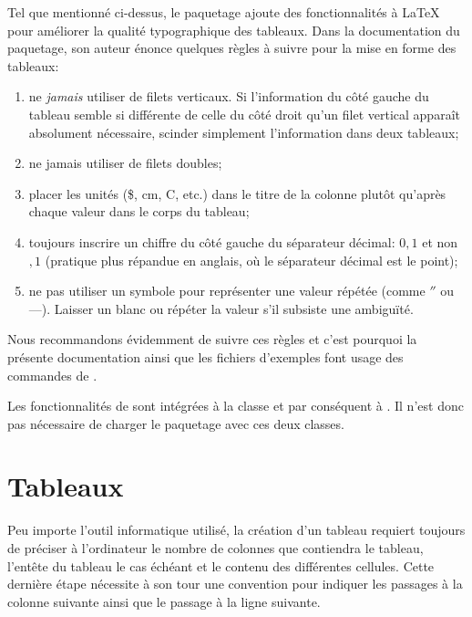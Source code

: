 Tel que mentionné ci-dessus, le paquetage  ajoute des
fonctionnalités à {\LaTeX} pour améliorer la qualité typographique des
tableaux. Dans la documentation du paquetage, son auteur énonce
quelques règles à suivre pour la mise en forme des tableaux:
\begin{enumerate}
\item ne \emph{jamais} utiliser de filets verticaux. Si l'information
  du côté gauche du tableau semble si différente de celle du côté
  droit qu'un filet vertical apparaît absolument nécessaire, scinder
  simplement l'information dans deux tableaux;
\item ne jamais utiliser de filets doubles;
\item placer les unités (\$, cm, {\textdegree}C, etc.) dans le titre
  de la colonne plutôt qu'après chaque valeur dans le corps du
  tableau;
\item toujours inscrire un chiffre du côté gauche du séparateur
  décimal: $0,1$ et non $,1$ (pratique plus répandue en anglais, où le
  séparateur décimal est le point);
\item ne pas utiliser un symbole pour représenter une valeur
  répétée (comme $''$ ou ---). Laisser un blanc ou répéter la
  valeur s'il subsiste une ambiguïté.
\end{enumerate}

Nous recommandons évidemment de suivre ces règles et c'est pourquoi la
présente documentation ainsi que les fichiers d'exemples font usage
des commandes de .

Les fonctionnalités de  sont intégrées à la classe
 et par conséquent à . Il n'est donc pas
nécessaire de charger le paquetage avec ces deux classes.



\section{Tableaux}
\label{sec:tableaux:tableaux}

Peu importe l'outil informatique utilisé, la création d'un tableau
requiert toujours de préciser à l'ordinateur le nombre de colonnes que
contiendra le tableau, l'entête du tableau le cas échéant et le contenu
des différentes cellules. Cette dernière étape nécessite à son tour
une convention pour indiquer les passages à la colonne suivante
ainsi que le passage à la ligne suivante.

